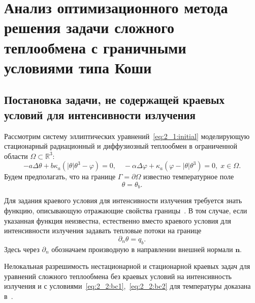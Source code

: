 \section{Анализ оптимизационного метода решения
задачи сложного теплообмена с граничными условиями типа
Коши}\label{sec:ch2/sec2}

\subsection{Постановка задачи, не содержащей краевых условий для интенсивности излучения}\label{subsec:ch2/sec2/subsec1}
Рассмотрим систему эллиптических уравнений~\eqref{eq:2_1:initial}
моделирующую стационарный радиационный и диффузиозный теплообмен в
ограниченной области $\Omega \subset \mathbb{R}^3$:
\begin{equation}
    \label{eq:2_2:eq1}
    - a\Delta\theta + b\kappa_a(|\theta|\theta^3- \varphi)=0, \quad
    -\alpha \Delta \varphi
    + \kappa_a(\varphi-|\theta|\theta^3)=0,\; x\in\Omega.
\end{equation}
Будем предполагать, что на границе $\Gamma = \partial \Omega$ известно температурное поле
\begin{equation}
    \label{eq:2_2:bc1} \theta = \theta_b.
\end{equation}


Для задания краевого условия для интенсивности излучения
требуется знать функцию, описывающую отражающие свойства границы~\cite{JVM-14}.
В том случае, если указанная функция неизвестна, естественно вместо
краевого условия для интенсивности излучения задавать тепловые потоки на границе
\begin{equation}
    \label{eq:2_2:bc2}
    \partial_n\theta = q_b.
\end{equation}
Здесь через $\partial_n$ обозначаем производную в направлении
внешней нормали $\mathbf n$.

Нелокальная разрешимость нестационарной и
стационарной краевых задач для уравнений сложного теплообмена
без краевых условий на интенсивность излучения и
с условиями~\eqref{eq:2_2:bc1},~\eqref{eq:2_2:bc2}
для температуры доказана в~\cite{Chebotarev2019Problem,CMMP20}.

